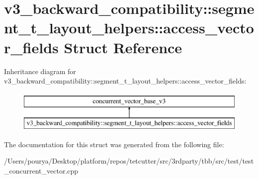 \hypertarget{structv3__backward__compatibility_1_1segment__t__layout__helpers_1_1access__vector__fields}{}\section{v3\+\_\+backward\+\_\+compatibility\+:\+:segment\+\_\+t\+\_\+layout\+\_\+helpers\+:\+:access\+\_\+vector\+\_\+fields Struct Reference}
\label{structv3__backward__compatibility_1_1segment__t__layout__helpers_1_1access__vector__fields}
Inheritance diagram for v3\+\_\+backward\+\_\+compatibility\+:\+:segment\+\_\+t\+\_\+layout\+\_\+helpers\+:\+:access\+\_\+vector\+\_\+fields\+:\begin{figure}[H]
\begin{center}
\leavevmode
\includegraphics[height=2.000000cm]{structv3__backward__compatibility_1_1segment__t__layout__helpers_1_1access__vector__fields}
\end{center}
\end{figure}


The documentation for this struct was generated from the following file\+:\begin{DoxyCompactItemize}
\item 
/\+Users/pourya/\+Desktop/platform/repos/tetcutter/src/3rdparty/tbb/src/test/test\+\_\+concurrent\+\_\+vector.\+cpp\end{DoxyCompactItemize}
